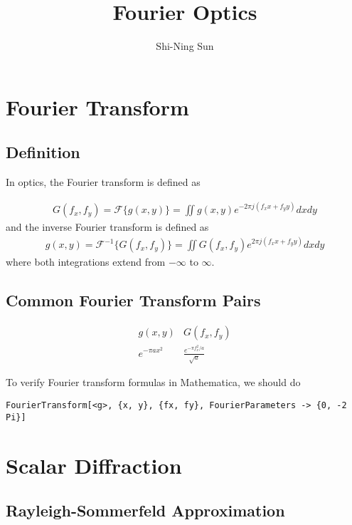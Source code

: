 \documentclass{article}
\begin{document}
\title{Fourier Optics}
\author{Shi-Ning Sun}
\maketitle

\section{Fourier Transform}

\subsection{Definition}

In optics, the Fourier transform is defined as

\begin{align}
    G(f_x, f_y) = \mathcal{F}\{g(x, y)\} = \iint g(x, y) e^{-2\pi j(f_x x + f_y y)} dx dy
\end{align}
and the inverse Fourier transform is defined as
\begin{align}
    g(x, y) = \mathcal{F}^{-1}\{G(f_x, f_y)\} = \iint G(f_x, f_y) e^{2\pi j(f_x x + f_y y)} dx dy
\end{align} 
where both integrations extend from $-\infty$ to $\infty$.

\subsection{Common Fourier Transform Pairs}

$$
\begin{array}{c|c}
    g(x, y) & G(f_x, f_y) \\
    \hline
    e^{-\pi a x^2} & \frac{e^{-\pi f_x^2 / a}}{\sqrt{a}}
\end{array}
$$

To verify Fourier transform formulas in Mathematica, we should do

\begin{verbatim}
FourierTransform[<g>, {x, y}, {fx, fy}, FourierParameters -> {0, -2 Pi}]
\end{verbatim}


\section{Scalar Diffraction}

\subsection{Rayleigh-Sommerfeld Approximation}
\end{document}
